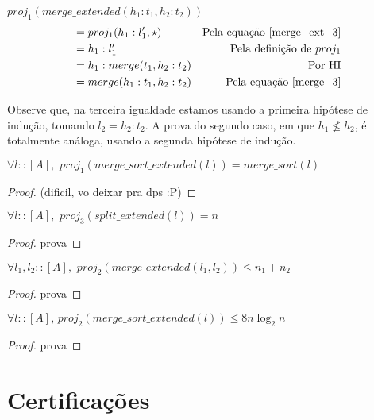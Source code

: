\documentclass[12pt, oneside, a4paper,english,brazil]{abntex2}
\begin{document}
$ proj_{1}(merge\_extended(h_{1} : t_{1}, h_{2} : t_{2})) $
\begin{align*}
 &= proj_{1}(h_{1} : l'_{1}, \star) &\text{Pela equa\c{c}\~ao \ref{merge_ext_3}} \\
                                                          &= h_{1} : l'_{1} &\text{Pela defini\c{c}\~ao de $proj_{1}$} \\
  &= h_{1} : merge(t_{1}, h_{2} : t_{2}) &\text{Por HI} \\
  &= merge(h_{1} : t_{1}, h_{2} : t_{2}) &\text{Pela equa\c{c}\~ao \ref{merge_3}}
\end{align*}

Observe que, na terceira igualdade estamos usando a primeira hip\'otese de indu\c{c}\~ao, tomando $l_{2} = h_{2} : t_{2}$. A prova do segundo caso, em que $h_{1} \not\le h_{2}$, \'e totalmente an\'aloga, usando a segunda hip\'otese de indu\c{c}\~ao.

\begin{teorema}
  $\forall l :: [A], \,\, proj_{1}(merge\_sort\_extended(l)) = merge\_sort(l)$
\end{teorema}

\begin{proof}
  (dificil, vo deixar pra dps :P)
\end{proof}

\begin{teorema}
  $\forall l :: [A], \,\, proj_{3}(split\_extended(l)) = n$
\end{teorema}

\begin{proof}
  prova
\end{proof}

\begin{teorema}
  $\forall l_{1}, l_{2} :: [A], \,\, proj_{2}(merge\_extended(l_{1}, l_{2})) \le n_{1} + n_{2}$
\end{teorema}

\begin{proof}
  prova
\end{proof}

\begin{teorema}
  $\forall l :: [A], \, proj_{2}(merge\_sort\_extended(l)) \le 8 n \log_{2}n$
\end{teorema}

\begin{proof}
  prova
\end{proof}

\section{Certifica\c{c}\~oes}
\end{document}
